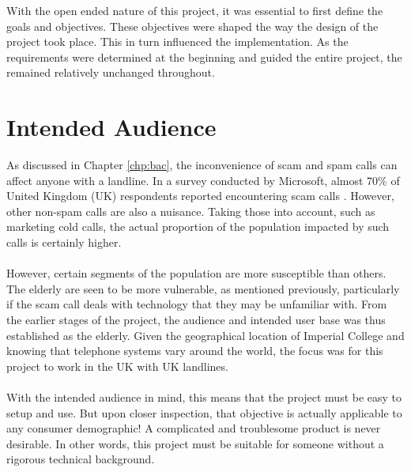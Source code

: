 \documentclass[main.tex]{subfiles}
\begin{document}
With the open ended nature of this project, it was essential to first define the goals and objectives. These objectives were shaped the way the design of the project took place. This in turn influenced the implementation. As the requirements were determined at the beginning and guided the entire project, the remained relatively unchanged throughout.


\section{Intended Audience}
As discussed in Chapter \ref{chp:bac}, the inconvenience of scam and spam calls can affect anyone with a landline. In a survey conducted by Microsoft, almost 70\% of United Kingdom (UK) respondents reported encountering scam calls \cite{microsoft-survey}. However, other non-spam calls are also a nuisance. Taking those into account, such as marketing cold calls, the actual proportion of the population impacted by such calls is certainly higher.
\\\\
However, certain segments of the population are more susceptible than others. The elderly are seen to be more vulnerable, as mentioned previously, particularly if the scam call deals with technology that they may be unfamiliar with. From the earlier stages of the project, the audience and intended user base was thus established as the elderly. Given the geographical location of Imperial College and knowing that telephone systems vary around the world, the focus was for this project to work in the UK with UK landlines.
\\\\
With the intended audience in mind, this means that the project must be easy to setup and use. But upon closer inspection, that objective is actually applicable to any consumer demographic! A complicated and troublesome product is never desirable. In other words, this project must be suitable for someone without a rigorous technical background.
\end{document}
